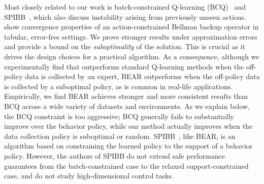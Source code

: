 Most closely related to our work is batch-constrained Q-learning (BCQ)~\citep{fujimoto2018off} and SPIBB~\citep{laroche2019spibb},
which also discuss instability arising from previously unseen actions. \citet{fujimoto2018off} show convergence properties of an action-constrained Bellman backup operator in tabular, error-free settings. We prove stronger results under approximation errors and provide a bound on the \emph{suboptimality} of the solution. This is crucial as it drives the design choices for a practical algorithm. As a consequence, although we experimentally find that \citep{fujimoto2018off} outperforms standard Q-learning methods when the off-policy data is collected by an expert, BEAR outperforms \cite{fujimoto2018off} when the off-policy data is collected by a suboptimal policy, as is common in real-life applications. Empirically, we find BEAR achieves stronger and more consistent results than BCQ across a wide variety of datasets and environments. As we explain below, the BCQ constraint is too aggressive;  BCQ generally fails to substantially improve over the behavior policy, while our method actually improves when the data collection policy is suboptimal or random. SPIBB~\citep{laroche2019spibb}, like BEAR, is an algorithm based on constraining the learned policy to the support of a behavior policy. However, the authors of SPIBB do not extend safe performance guarantees from the batch-constrained case to the relaxed support-constrained case, and do not study high-dimensional control tasks. 
